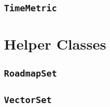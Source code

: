 \subsection{\texttt{TimeMetric}}

\section{Helper Classes}

\subsection{\texttt{RoadmapSet}}

\subsection{\texttt{VectorSet}}

